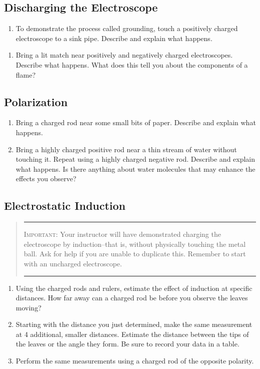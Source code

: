 \subsection{Discharging the Electroscope}
\begin{enumerate}[resume]
 \item To demonstrate the process called grounding, touch a positively charged electroscope to a sink pipe.  Describe and explain what happens.
\end{enumerate}
\begin{enumerate}[resume]
	\item Bring a lit match near positively and negatively charged electroscopes. Describe what happens.  What does this tell you about the components of a flame?

\end{enumerate}
\subsection{Polarization}
\begin{enumerate}[resume]
	\item Bring a charged rod near some small bits of paper.  Describe and explain what happens.
	\item Bring a highly charged positive rod near a thin stream of water without touching it.  Repeat using a highly charged negative rod.  Describe and explain what happens. Is there anything about water molecules that may enhance the effects you observe?
\end{enumerate}

\subsection{Electrostatic Induction}
\begin{quote}\hrule
\textsc{Important:}
Your instructor will have demonstrated charging the electroscope by induction--that is, without physically touching the metal ball.  Ask for help if you are unable to duplicate this.  Remember to start with an uncharged electroscope.
\hrule
\end{quote}
\begin{enumerate}[resume]
	\item Using the charged rods and rulers, estimate the effect of induction at specific distances.  How far away can a charged rod be before you observe the leaves moving?
	 \item Starting with the distance you just determined, make the same measurement at 4 additional, smaller distances.  Estimate the distance between the tips of the leaves or the angle they form.  Be sure to record your data in a table.
	 \item Perform the same measurements using a charged rod of the opposite polarity.
\end{enumerate}
 
